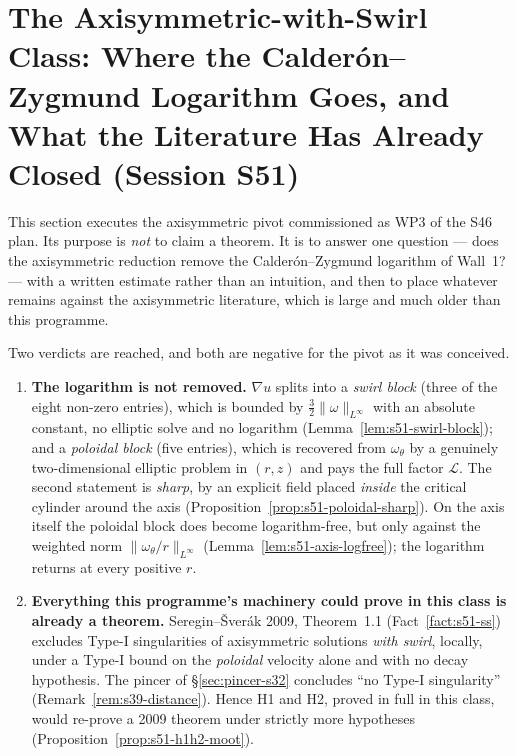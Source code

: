\documentclass[11pt]{article}
\theoremstyle{definition}
\theoremstyle{remark}
\begin{document}
\section{The Axisymmetric-with-Swirl Class: Where the Calder\'on--Zygmund
Logarithm Goes, and What the Literature Has Already Closed (Session S51)}
\label{sec:axisym-s51}

This section executes the axisymmetric pivot commissioned as WP3 of the S46
plan. Its purpose is \emph{not} to claim a theorem. It is to answer one
question --- does the axisymmetric reduction remove the Calder\'on--Zygmund
logarithm of Wall~1? --- with a written estimate rather than an intuition, and
then to place whatever remains against the axisymmetric literature, which is
large and much older than this programme.

Two verdicts are reached, and both are negative for the pivot as it was
conceived.

\begin{enumerate}[label=\textup{(\Roman*)},leftmargin=2.6em]
\item \textbf{The logarithm is not removed.} $\nabla u$ splits into a
  \emph{swirl block} (three of the eight non-zero entries), which is bounded
  by $\tfrac32\|\omega\|_{L^\infty}$ with an absolute constant, no elliptic
  solve and no logarithm (Lemma~\ref{lem:s51-swirl-block}); and a
  \emph{poloidal block} (five entries), which is recovered from $\omega_\theta$
  by a genuinely two-dimensional elliptic problem in $(r,z)$ and pays the full
  factor $\mathcal{L}$. The second statement is \emph{sharp}, by an explicit
  field placed \emph{inside} the critical cylinder around the axis
  (Proposition~\ref{prop:s51-poloidal-sharp}). On the axis itself the poloidal
  block does become logarithm-free, but only against the weighted norm
  $\|\omega_\theta/r\|_{L^\infty}$ (Lemma~\ref{lem:s51-axis-logfree}); the
  logarithm returns at every positive $r$.
\item \textbf{Everything this programme's machinery could prove in this class
  is already a theorem.} Seregin--\v{S}ver\'ak 2009, Theorem~1.1
  (Fact~\ref{fact:s51-ss}) excludes Type-I singularities of axisymmetric
  solutions \emph{with swirl}, locally, under a Type-I bound on the
  \emph{poloidal} velocity alone and with no decay hypothesis. The pincer of
  \S\ref{sec:pincer-s32} concludes ``no Type-I singularity''
  (Remark~\ref{rem:s39-distance}). Hence H1 and H2, proved in full in this
  class, would re-prove a 2009 theorem under strictly more hypotheses
  (Proposition~\ref{prop:s51-h1h2-moot}).
\end{enumerate}
\end{document}
